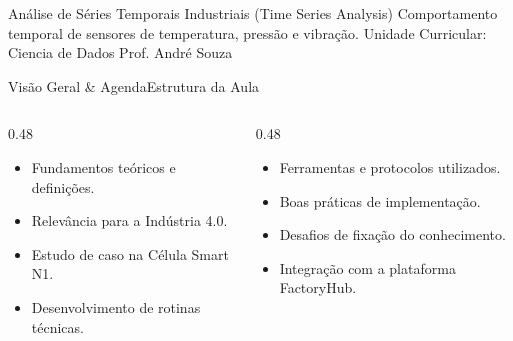 
\senaicover
  {Análise de Séries Temporais Industriais (Time Series Analysis)}
  {Comportamento temporal de sensores de temperatura, pressão e vibração.}
  {Unidade Curricular: Ciencia de Dados}
  {Prof. André Souza}

\begin{senaiframe}{Visão Geral \& Agenda}{Estrutura da Aula}
  \begin{columns}[t]
    \begin{column}{0.48\textwidth}
      \begin{tcolorbox}[senaibluecard, title={1. Conceitos Chave}]
        \begin{itemize}
          \item Fundamentos teóricos e definições.
          \item Relevância para a Indústria 4.0.
        \end{itemize}
      \end{tcolorbox}
      \vspace{4pt}
      \begin{tcolorbox}[senaiambercard, title={3. Aplicação Prática}]
        \begin{itemize}
          \item Estudo de caso na Célula Smart N1.
          \item Desenvolvimento de rotinas técnicas.
        \end{itemize}
      \end{tcolorbox}
    \end{column}
    \begin{column}{0.48\textwidth}
      \begin{tcolorbox}[senairedcard, title={2. Detalhamento Técnico}]
        \begin{itemize}
          \item Ferramentas e protocolos utilizados.
          \item Boas práticas de implementação.
        \end{itemize}
      \end{tcolorbox}
      \vspace{4pt}
      \begin{tcolorbox}[senaigreencard, title={4. Exercícios \& Avaliação}]
        \begin{itemize}
          \item Desafios de fixação do conhecimento.
          \item Integração com a plataforma FactoryHub.
        \end{itemize}
      \end{tcolorbox}
    \end{column}
  \end{columns}
\end{senaiframe}

